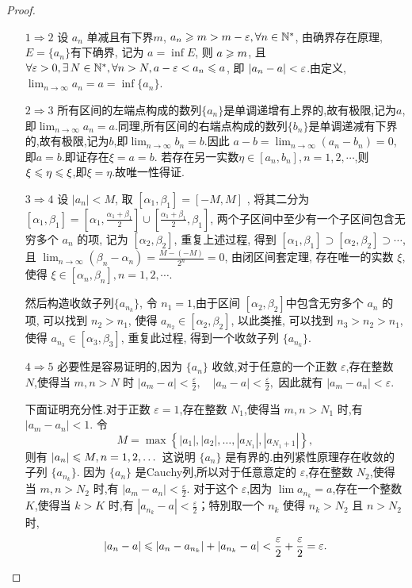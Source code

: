 \begin{proof}
    \begin{enumerate}
        \item[$ 1 \Rightarrow 2 $]
            设 $a_n$ 单减且有下界$m$, $a_n \geqslant m > m-\varepsilon, \forall n \in \mathbb{N}^*$, 由确界存在原理, $E=\{a_n\}$有下确界, 记为 $a=\inf E$, 则 $a \geqslant m$, 且 $\forall \ve >0, \exists N\in \mathbb{N}^*, \forall n>N, a-\ve < a_n \les a$, 即 $|a_n-a|<\varepsilon$.由定义, $\lim_{n \to \infty} a_n=a = \inf \{ a_n \}$.
        \item[$ 2 \Rightarrow 3 $]
            所有区间的左端点构成的数列$\{a_n\}$是单调递增有上界的,故有极限,记为$a$,即$\lim_{n \to \infty} a_n = a$.同理,所有区间的右端点构成的数列$\{b_n\}$是单调递减有下界的,故有极限,记为$b$,即$\lim_{n \to \infty} b_n = b$.因此 $a-b = \lim_{n \to \infty} (a_n - b_n) = 0$,即$a=b$.即证存在$\xi = a = b$.
            若存在另一实数$\eta \in [a_n,b_n],n=1,2,\cdots$,则$\xi \leqslant \eta \leqslant \xi$,即$\xi = \eta$.故唯一性得证.
        \item[$ 3 \Rightarrow 4 $]
            设 $ |a_n| < M $, 取 $[\alpha_1, \beta_1] = [-M,M]$ , 将其二分为 $[\alpha_1, \beta_1] = [\alpha_1, \frac{\alpha_1+\beta_1}{2}] \cup [\frac{\alpha_1+\beta_1}{2}, \beta_1]$, 两个子区间中至少有一个子区间包含无穷多个 $a_n$ 的项, 记为 $[\alpha_2, \beta_2]$, 重复上述过程, 得到 $[\alpha_1, \beta_1] \supset [\alpha_2, \beta_2] \supset \cdots$, 且 $\lim_{n \to \infty} (\beta_n - \alpha_n) = \frac{M - (- M)}{2^n} = 0$, 由闭区间套定理, 存在唯一的实数 $\xi$, 使得 $\xi \in [\alpha_n, \beta_n], n = 1,2,\cdots$.

            然后构造收敛子列$\{a_{n_k}\}$, 令 $n_1 = 1 $,由于区间 $[\alpha_2, \beta_2]$中包含无穷多个 $a_n$ 的项, 可以找到 $n_2 > n_1$, 使得 $a_{n_2} \in [\alpha_2, \beta_2]$, 以此类推, 可以找到 $n_3 > n_2 > n_1$, 使得 $a_{n_3} \in [\alpha_3, \beta_3]$, 重复此过程, 得到一个收敛子列 $\{a_{n_k}\}$.

        \item[$ 4 \Rightarrow 5 $]
            必要性是容易证明的,因为 $\{a_n\}$ 收敛,对于任意的一个正数 $\varepsilon$,存在整数 $N$,使得当 $m, n > N$ 时
            $
                |a_m - a| < \frac{\varepsilon}{2}, \quad |a_n - a| < \frac{\varepsilon}{2},
            $
            因此就有
            $
                |a_m - a_n| < \varepsilon.
            $

            下面证明充分性.对于正数 $\varepsilon = 1$,存在整数 $N_1$,使得当 $m, n > N_1$ 时,有 $|a_m - a_n| < 1$. 令
            $$
                M = \max\left\{ |a_1|, |a_2|, \dots, |a_{N_1}|, |a_{N_1+1}| \right\},
            $$
            则有 $|a_n| \leqslant M,  n = 1, 2, \dots$ 这说明 $\{a_n\}$ 是有界的.由列紧性原理存在收敛的子列 $\{a_{n_k}\}$.
            因为 $\{a_n\}$ 是Cauchy列,所以对于任意意定的 $\varepsilon$,存在整数 $N_2$,使得当 $m, n > N_2$ 时,有
            $
                |a_m - a_n| < \frac{\varepsilon}{2}.
            $
            对于这个 $\varepsilon$,因为 $\lim a_{n_k} = a$,存在一个整数 $K$,使得当 $k > K$ 时,有 $|a_{n_k} - a| < \frac{\varepsilon}{2}$；特別取一个 $n_k$ 使得 $n_k > N_2$ 且 $n > N_2$ 时,
            $$
                |a_n - a| \leqslant |a_n - a_{n_k}| + |a_{n_k} - a| < \frac{\varepsilon}{2} + \frac{\varepsilon}{2} = \varepsilon.
            $$


\end{enumerate}
\end{proof}
